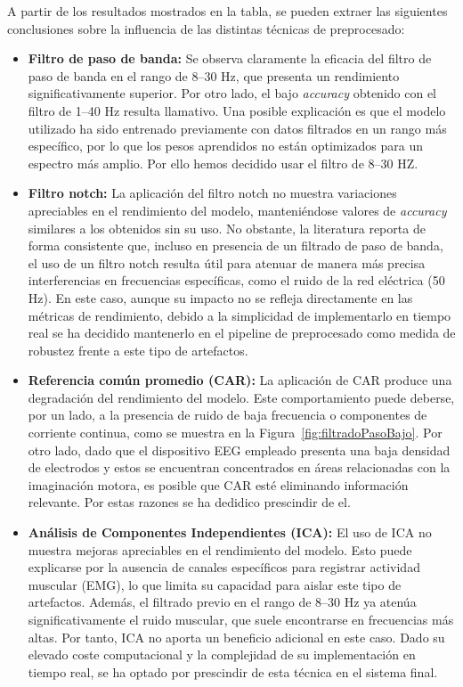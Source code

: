 A partir de los resultados mostrados en la tabla, se pueden extraer las siguientes conclusiones sobre la influencia de las distintas técnicas de preprocesado:

\begin{itemize}

\item \textbf{Filtro de paso de banda:} Se observa claramente la eficacia del filtro de paso de banda en el rango de 8--30 Hz, que presenta un rendimiento significativamente superior. Por otro lado, el bajo \textit{accuracy} obtenido con el filtro de 1--40 Hz resulta llamativo. Una posible explicación es que el modelo utilizado ha sido entrenado previamente con datos filtrados en un rango más específico, por lo que los pesos aprendidos no están optimizados para un espectro más amplio. Por ello hemos decidido usar el filtro de 8--30 HZ.

\item \textbf{Filtro notch:} La aplicación del filtro notch no muestra variaciones apreciables en el rendimiento del modelo, manteniéndose valores de \textit{accuracy} similares a los obtenidos sin su uso. No obstante, la literatura reporta de forma consistente que, incluso en presencia de un filtrado de paso de banda, el uso de un filtro notch resulta útil para atenuar de manera más precisa interferencias en frecuencias específicas, como el ruido de la red eléctrica (50 Hz). En este caso, aunque su impacto no se refleja directamente en las métricas de rendimiento, debido a la simplicidad de implementarlo en tiempo real se ha decidido mantenerlo en el pipeline de preprocesado como medida de robustez frente a este tipo de artefactos.

\item \textbf{Referencia común promedio (CAR):} La aplicación de CAR produce una degradación del rendimiento del modelo. Este comportamiento puede deberse, por un lado, a la presencia de ruido de baja frecuencia o componentes de corriente continua, como se muestra en la Figura~\ref{fig:filtradoPasoBajo}. Por otro lado, dado que el dispositivo EEG empleado presenta una baja densidad de electrodos y estos se encuentran concentrados en áreas relacionadas con la imaginación motora, es posible que CAR esté eliminando información relevante. Por estas razones se ha dedidico prescindir de el. 

\item \textbf{Análisis de Componentes Independientes (ICA):} El uso de ICA no muestra mejoras apreciables en el rendimiento del modelo. Esto puede explicarse por la ausencia de canales específicos para registrar actividad muscular (EMG), lo que limita su capacidad para aislar este tipo de artefactos. Además, el filtrado previo en el rango de 8--30 Hz ya atenúa significativamente el ruido muscular, que suele encontrarse en frecuencias más altas. Por tanto, ICA no aporta un beneficio adicional en este caso. Dado su elevado coste computacional y la complejidad de su implementación en tiempo real, se ha optado por prescindir de esta técnica en el sistema final.

\end{itemize}